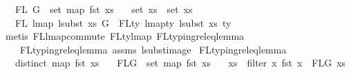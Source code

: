 \begin{isabellebody}
\ \ \ {\isachardoublequoteopen}FL\ G\ {\isacharequal}{\kern0pt}\ set\ {\isacharparenleft}{\kern0pt}map\ fst\ xs{}{\isacharparenright}{\kern0pt}{\isachardoublequoteclose}\isanewline
\ \ \ {\isachardoublequoteopen}set\ xs{}\ {\isasymsubseteq}\ set\ xs{\isachardoublequoteclose}\isanewline
\ \ \ {\isachardoublequoteopen}FL\ {\isacharparenleft}{\kern0pt}lmap\ {\isacharparenleft}{\kern0pt}lsubst\ xs{\isacharparenright}{\kern0pt}\ G{\isacharparenright}{\kern0pt}\ {\isacharequal}{\kern0pt}\ FLty\ {\isacharparenleft}{\kern0pt}lmap{\isacharunderscore}{\kern0pt}ty\ {\isacharparenleft}{\kern0pt}lsubst\ xs{\isacharparenright}{\kern0pt}\ ty{\isacharparenright}{\kern0pt}{\isachardoublequoteclose}\isanewline
%
\isadelimproof
%
\endisadelimproof
%
\isatagproof
{}\isamarkupfalse%
\ {\isacharparenleft}{\kern0pt}metis\ FL{\isacharunderscore}{\kern0pt}lmap{\isacharunderscore}{\kern0pt}commute\ FL{\isacharunderscore}{\kern0pt}ty{\isacharunderscore}{\kern0pt}lmap{}\ FL{\isacharunderscore}{\kern0pt}typing{\isacharunderscore}{\kern0pt}rel{\isacharunderscore}{\kern0pt}eq{\isacharunderscore}{\kern0pt}lemma{}\isanewline
\ \ \ \ FL{\isacharunderscore}{\kern0pt}typing{\isacharunderscore}{\kern0pt}rel{\isacharunderscore}{\kern0pt}eq{\isacharunderscore}{\kern0pt}lemma{}\ assms{\isacharparenleft}{\kern0pt}{}{\isacharcomma}{\kern0pt}{}{\isacharcomma}{\kern0pt}{}{\isacharcomma}{\kern0pt}{}{\isacharcomma}{\kern0pt}{}{\isacharparenright}{\kern0pt}\ lsubst{\isacharunderscore}{\kern0pt}image{\isacharparenright}{\kern0pt}%
\endisatagproof
{\isafoldproof}%
%
\isadelimproof
\isanewline
%
\endisadelimproof
\isanewline
\isanewline
\isanewline
{}\isamarkupfalse%
\ FL{\isacharunderscore}{\kern0pt}typing{\isacharunderscore}{\kern0pt}rel{\isacharunderscore}{\kern0pt}eq{\isacharunderscore}{\kern0pt}lemma{}{\isacharcolon}{\kern0pt}\isanewline
\ \ \ {\isachardoublequoteopen}distinct\ {\isacharparenleft}{\kern0pt}map\ fst\ xs{\isacharparenright}{\kern0pt}{\isachardoublequoteclose}\isanewline
\ \ \ {\isachardoublequoteopen}FLG\ {\isasymsubseteq}\ set\ {\isacharparenleft}{\kern0pt}map\ fst\ xs{\isacharparenright}{\kern0pt}{\isachardoublequoteclose}\isanewline
\ \ \ {\isachardoublequoteopen}xs{}\ {\isacharequal}{\kern0pt}\ filter\ {\isacharparenleft}{\kern0pt}{\isasymlambda}x{\isachardot}{\kern0pt}\ fst\ x\ {\isasymin}\ FLG{\isacharparenright}{\kern0pt}\ xs{\isachardoublequoteclose}\isanewline

\end{isabellebody}
